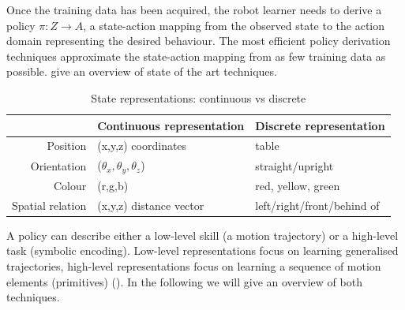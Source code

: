 Once the training data has been acquired, the robot learner needs to derive a policy $\pi : Z \rightarrow A$, a state-action mapping from the observed state to the action domain representing the desired behaviour.
The most efficient policy derivation techniques approximate the state-action mapping from as few training data as possible.
\cite{chernova2014robot} give an overview of state of the art techniques.

\begin{table}[ht]
	\centering
	\begin{tabular}{r|ll}
		& Continuous representation & Discrete representation\\ \hline
		Position & (x,y,z) coordinates & table \\
		Orientation & ($\theta_x,\theta_y,\theta_z$) & straight/upright \\
		Colour & (r,g,b) & red, yellow, green\\
		Spatial relation & (x,y,z) distance vector & left/right/front/behind of 
	\end{tabular}
\caption{State representations: continuous vs discrete}
\label{tab:representations}
\end{table}

A policy can describe either a low-level skill (\ie a motion trajectory) or a high-level task (\ie symbolic encoding).
Low-level representations focus on learning generalised trajectories, high-level representations focus on learning a sequence of motion elements (primitives) (\cite{peppoloni2014ros}). 
In the following we will give an overview of both techniques.

